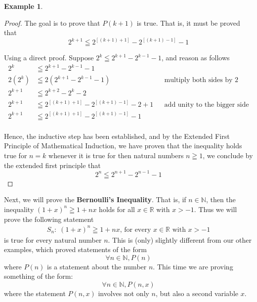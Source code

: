 \documentclass{book}
\theoremstyle{definition}
\newtheorem{example}{Example}[definition]
\theoremstyle{remark}
\newcommand{\bb}[1]{\mathbb{#1}}
\begin{document}
\begin{example}
\begin{proof}
        The goal is to prove that $P(k+1)$ is true. That is, it must be proved that  
            \begin{equation*}
                2^{k+1} \leqq 2^{[(k+1)+1]} - 2^{[(k+1)-1]} - 1 
            \end{equation*}
        
        Using a direct proof. Suppose $2^k \leqq 2^{k+1} - 2^{k-1} - 1$, and reason as follows
            \begin{align*}
                2^k & \leqq 2^{k+1} - 2^{k-1} - 1 \\
                2(2^k) & \leqq 2(2^{k+1} - 2^{k-1} - 1) && \text{multiply both sides by 2} \\     
                2^{k+1} & \leqq 2^{k+2} - 2^{k} - 2 \\
                2^{k+1} & \leqq 2^{[(k+1)+1]} - 2^{[(k+1)-1]} - 2 + 1 && \text{add unity to the bigger side} \\
                2^{k+1} & \leqq 2^{[(k+1)+1]} - 2^{[(k+1)-1]} - 1 \\
            \end{align*}
    
    Hence, the inductive step has been established, and by the Extended First Principle of Mathematical Induction, we have proven that the inequality holds true for $n=k$ whenever it is true for then natural numbers $n \geqq 1$, we conclude by the extended first principle that
        \begin{equation*}
            2^n \leqq 2^{n+1} - 2^{n-1} - 1  
        \end{equation*}
 
\end{proof}
\end{example}

\newpage
Next, we will prove the \textbf{Bernoulli's Inequality}. That is, if $n \in \bb{N}$, then the inequality $(1+x)^n \geqq 1 + nx$ holds for all $x \in \bb{R}$ with $x > -1$. Thus we will prove the following statement
    \begin{align*}
        S_n: \; (1+x)^n \geqq 1 + nx \text{, for every } x \in \bb{R} \text{ with } x > -1
    \end{align*}
is true for every natural number $n$. This is (only) slightly different from our other examples, which proved statements of the form $$ \forall n \in \bb{N}, P(n) $$ where $P(n)$ is a statement about the number $n$. This time we are proving something of the form: $$ \forall n \in \bb{N}, P(n,x)$$
where the statement $P(n,x)$ involves not only $n$, but also a second variable $x$.
\end{document}
